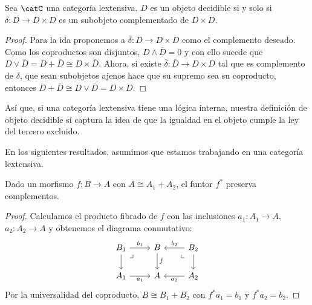 \begin{proposition}
  Sea $\catC$ una categoría lextensiva. $D$ es un objeto decidible si y solo si $\delta\colon D\to D\times D$ es un subobjeto complementado
  de $D\times D$.
\end{proposition}
\begin{proof}
  Para la ida proponemos a $\overline{\delta}\colon\overline{D}\to D\times D$ como el complemento deseado.
  Como los coproductos son disjuntos, $D\land\overline{D}=0$ y con ello sucede
  que $D\lor\overline{D}=D+\overline{D}\cong D\times\overline{D}$.
  Ahora, si existe $\overline{\delta}\colon\overline{D}\to D\times D$ tal que es complemento de $\delta$,
  que sean subobjetos ajenos hace que su supremo sea su coproducto, entonces $D+\overline{D}\cong D\lor\overline{D}=D\times D$.
\end{proof}

Así que, si una categoría lextensiva tiene una lógica interna, nuestra definición
de objeto decidible sí captura la idea de que la igualdad en el objeto cumple la ley
del tercero excluido. 

En los siguientes resultados, asumimos que estamos trabajando en una categoría lextensiva.

\begin{proposition}[label=prop:fcomplementos]
  Dado un morfismo $f\colon B\to A$ con $A\cong A_1+A_2$, el funtor $f^*$ preserva complementos.
\end{proposition}
\begin{proof}
  Calculamos el producto fibrado de $f$ con las inclusiones $a_1\colon A_1\to A$, $a_2\colon A_2\to A$
  y obtenemos el diagrama conmutativo:
  \begin{equation*}
    \begin{tikzcd}
        B_1\ar[swap]{d}{}\ar{r}{b_1}\ar[phantom,pos=0.1]{rd}{\lrcorner} & B\ar{d}{f} & B_2\ar[phantom,pos=0.1]{ld}{\llcorner}\ar[swap]{l}{b_2}\ar{d}{} \\
        A_1\ar[swap]{r}{a_1} & A & A_2\ar{l}{a_2}
    \end{tikzcd}
  \end{equation*}
  Por la universalidad del coproducto, $B\cong B_1+B_2$ con $f^*a_1=b_1$ y $f^*a_2=b_2$.
\end{proof}

